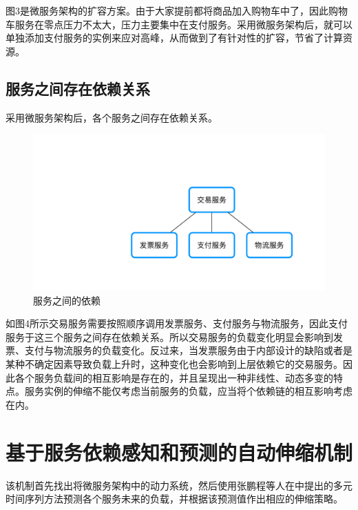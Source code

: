 \documentclass[10.5pt,twocolumn]{jbuaa}
\begin{document}
图3是微服务架构的扩容方案。由于大家提前都将商品加入购物车中了，因此购物车服务在零点压力不太大，压力主要集中在支付服务。采用微服务架构后，就可以单独添加支付服务的实例来应对高峰，从而做到了有针对性的扩容，节省了计算资源。

\subsection{服务之间存在依赖关系}
采用微服务架构后，各个服务之间存在依赖关系。
\begin{figure}[H]
\centering
\includegraphics [scale=0.4,trim=0 0 0 0]{./image/4.pdf}
\caption{服务之间的依赖}
\end{figure}
如图4所示交易服务需要按照顺序调用发票服务、支付服务与物流服务，因此支付服务于这三个服务之间存在依赖关系。所以交易服务的负载变化明显会影响到发票、支付与物流服务的负载变化。反过来，当发票服务由于内部设计的缺陷或者是某种不确定因素导致负载上升时，这种变化也会影响到上层依赖它的交易服务。因此各个服务负载间的相互影响是存在的，并且呈现出一种非线性、动态多变的特点。服务实例的伸缩不能仅考虑当前服务的负载，应当将个依赖链的相互影响考虑在内。

\section{基于服务依赖感知和预测的自动伸缩机制}
该机制首先找出将微服务架构中的动力系统，然后使用张鹏程等人在\cite{Service2018}中提出的多元时间序列方法预测各个服务未来的负载，并根据该预测值作出相应的伸缩策略。
\end{document}
